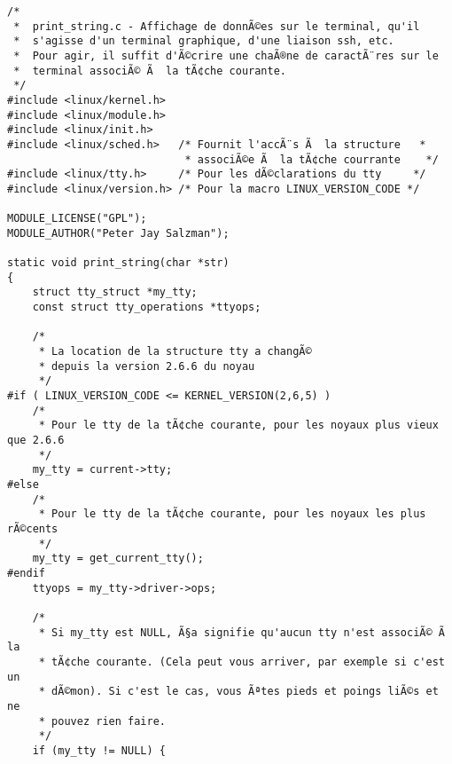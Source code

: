 \documentclass[11pt]{article}
\begin{document}
\begin{verbatim}
/*
 *  print_string.c - Affichage de donnÃ©es sur le terminal, qu'il
 *  s'agisse d'un terminal graphique, d'une liaison ssh, etc.
 *  Pour agir, il suffit d'Ã©crire une chaÃ®ne de caractÃ¨res sur le
 *  terminal associÃ© Ã  la tÃ¢che courante.
 */
#include <linux/kernel.h>
#include <linux/module.h>
#include <linux/init.h>
#include <linux/sched.h>   /* Fournit l'accÃ¨s Ã  la structure   *
                            * associÃ©e Ã  la tÃ¢che courrante    */
#include <linux/tty.h>     /* Pour les dÃ©clarations du tty     */
#include <linux/version.h> /* Pour la macro LINUX_VERSION_CODE */

MODULE_LICENSE("GPL");
MODULE_AUTHOR("Peter Jay Salzman");

static void print_string(char *str)
{
    struct tty_struct *my_tty;
    const struct tty_operations *ttyops;

    /*
     * La location de la structure tty a changÃ©
     * depuis la version 2.6.6 du noyau
     */
#if ( LINUX_VERSION_CODE <= KERNEL_VERSION(2,6,5) )
    /*
     * Pour le tty de la tÃ¢che courante, pour les noyaux plus vieux que 2.6.6
     */
    my_tty = current->tty;
#else
    /*
     * Pour le tty de la tÃ¢che courante, pour les noyaux les plus rÃ©cents
     */
    my_tty = get_current_tty();
#endif
    ttyops = my_tty->driver->ops;

    /*
     * Si my_tty est NULL, Ã§a signifie qu'aucun tty n'est associÃ© Ã  la
     * tÃ¢che courante. (Cela peut vous arriver, par exemple si c'est un
     * dÃ©mon). Si c'est le cas, vous Ãªtes pieds et poings liÃ©s et ne
     * pouvez rien faire.
     */
    if (my_tty != NULL) {


\end{verbatim}
\end{document}
